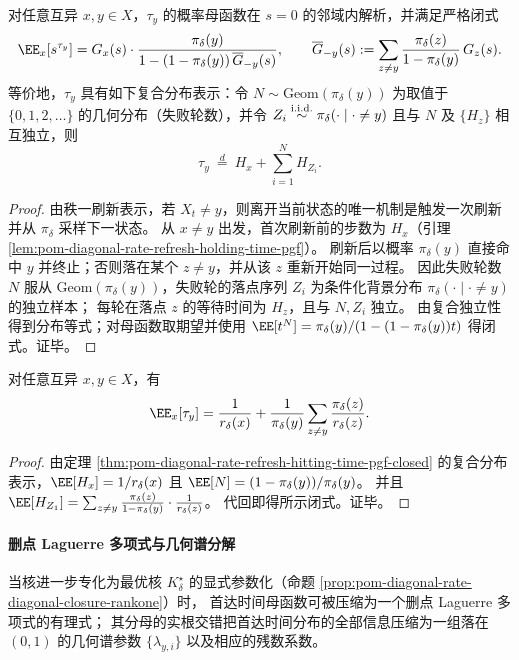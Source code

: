 \begin{theorem}[首达时间的概率母函数闭式与复合几何分解]\label{thm:pom-diagonal-rate-refresh-hitting-time-pgf-closed}
对任意互异 \(x,y\in X\)，\(\tau_y\) 的概率母函数在 \(s=0\) 的邻域内解析，并满足严格闭式
\[
\EE_x[s^{\tau_y}]
=G_x(s)\cdot \frac{\pi_\delta(y)}{1-(1-\pi_\delta(y))\,\overline G_{-y}(s)},
\qquad
\overline G_{-y}(s):=\sum_{z\ne y}\frac{\pi_\delta(z)}{1-\pi_\delta(y)}\,G_z(s).
\]
等价地，\(\tau_y\) 具有如下复合分布表示：令 \(N\sim\mathrm{Geom}(\pi_\delta(y))\) 为取值于 \(\{0,1,2,\dots\}\) 的几何分布（失败轮数），并令
\(
Z_i\overset{\text{\rm i.i.d.}}{\sim}\pi_\delta(\cdot\mid\cdot\ne y)
\)
且与 \(N\) 及 \(\{H_z\}\) 相互独立，则
\[
\tau_y\ \overset{d}{=}\ H_x+\sum_{i=1}^{N} H_{Z_i}.
\]
\end{theorem}
\begin{proof}
由秩一刷新表示，若 \(X_t\ne y\)，则离开当前状态的唯一机制是触发一次刷新并从 \(\pi_\delta\) 采样下一状态。
从 \(x\ne y\) 出发，首次刷新前的步数为 \(H_x\)（引理 \ref{lem:pom-diagonal-rate-refresh-holding-time-pgf}）。
刷新后以概率 \(\pi_\delta(y)\) 直接命中 \(y\) 并终止；否则落在某个 \(z\ne y\)，并从该 \(z\) 重新开始同一过程。
因此失败轮数 \(N\) 服从 \(\mathrm{Geom}(\pi_\delta(y))\)，失败轮的落点序列 \(Z_i\) 为条件化背景分布 \(\pi_\delta(\cdot\mid\cdot\ne y)\) 的独立样本；
每轮在落点 \(z\) 的等待时间为 \(H_z\)，且与 \(N,Z_i\) 独立。
由复合独立性得到分布等式；对母函数取期望并使用 \(\EE[t^N]=\pi_\delta(y)/(1-(1-\pi_\delta(y))t)\) 得闭式。证毕。
\end{proof}

\begin{corollary}[均值命中时闭式]\label{cor:pom-diagonal-rate-refresh-hitting-time-mean-closed}
对任意互异 \(x,y\in X\)，有
\[
\EE_x[\tau_y]=\frac{1}{r_\delta(x)}+\frac{1}{\pi_\delta(y)}\sum_{z\ne y}\frac{\pi_\delta(z)}{r_\delta(z)}.
\]
\end{corollary}
\begin{proof}
由定理 \ref{thm:pom-diagonal-rate-refresh-hitting-time-pgf-closed} 的复合分布表示，\(\EE[H_x]=1/r_\delta(x)\) 且
\(
\EE[N]=(1-\pi_\delta(y))/\pi_\delta(y)
\)。
并且
\(
\EE[H_{Z_1}]=\sum_{z\ne y}\frac{\pi_\delta(z)}{1-\pi_\delta(y)}\cdot \frac{1}{r_\delta(z)}
\)。
代回即得所示闭式。证毕。
\end{proof}

\paragraph{删点 Laguerre 多项式与几何谱分解}
当核进一步专化为最优核 \(K^\star_\delta\) 的显式参数化（命题 \ref{prop:pom-diagonal-rate-diagonal-closure-rankone}）时，
首达时间母函数可被压缩为一个删点 Laguerre 多项式的有理式；
其分母的实根交错把首达时间分布的全部信息压缩为一组落在 \((0,1)\) 的几何谱参数 \(\{\lambda_{y,i}\}\) 以及相应的残数系数。

